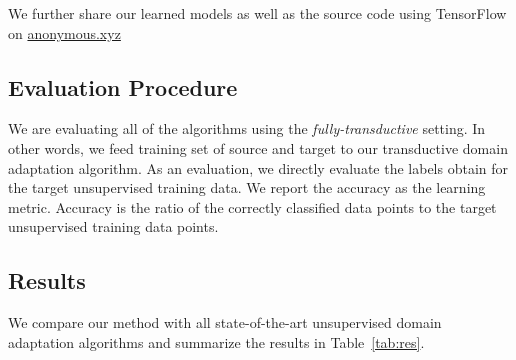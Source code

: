 We further share our learned models as well as the source code using TensorFlow\cite{tensorflow} on \url{anonymous.xyz}

\subsection{Evaluation Procedure}
We are evaluating all of the algorithms using the \emph{fully-transductive} setting. In other words,  we feed training set of source and target to our transductive domain adaptation algorithm. As an evaluation, we directly evaluate the labels obtain for the target unsupervised training data. We report the accuracy as the learning metric. Accuracy is the ratio of the correctly classified data points to the target unsupervised training data points.

\subsection{Results}
\begin{table}[t]
\caption{Accuracy of our method and the state-of-the-art algorithms on various datasets and various adaptation settings}
\label{tab:res}
\begin{sc}
\end{sc}
\end{table}
We compare our method with all state-of-the-art unsupervised domain adaptation algorithms and summarize the results in Table~\ref{tab:res}. 

